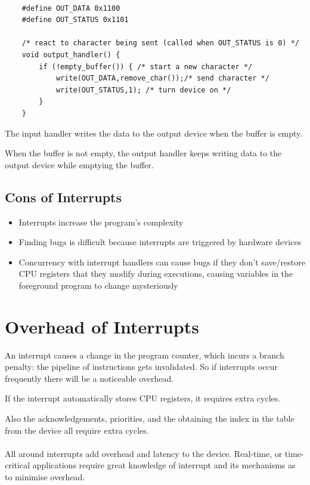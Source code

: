 \begin{lstlisting}

    #define OUT_DATA 0x1100
    #define OUT_STATUS 0x1101
    
    /* react to character being sent (called when OUT_STATUS is 0) */
    void output_handler() {
        if (!empty_buffer()) { /* start a new character */
            write(OUT_DATA,remove_char());/* send character */
            write(OUT_STATUS,1); /* turn device on */
        }
    }
\end{lstlisting}

The input handler writes the data to the output device when the buffer is empty.

When the buffer is not empty, the output handler keeps writing data to the output device while emptying
the buffer.

\subsection{Cons of Interrupts}

\begin{itemize}
    \item Interrupts increase the program's complexity
    \item Finding bugs is difficult because interrupts are triggered by hardware devices
    \item Concurrency with interrupt handlers can cause bugs if they don't save/restore CPU registers that they modify during executions, causing variables in the foreground program to change mysteriously
\end{itemize}

\section{Overhead of Interrupts}

An interrupt causes a change in the program counter, which incurs a branch penalty: the pipeline of
instructions gets invalidated. So if interrupts occur frequently there will be a noticeable overhead.


If the interrupt automatically stores CPU registers, it requires extra cycles.


Also the acknowledgements, priorities, and the obtaining the index in the table from the device all require
extra cycles.

\paragraph{}
All around interrupts add overhead and latency to the device.
Real-time, or time-critical applications require great knowledge of interrupt and its mechanisms as to
minimise overhead.

